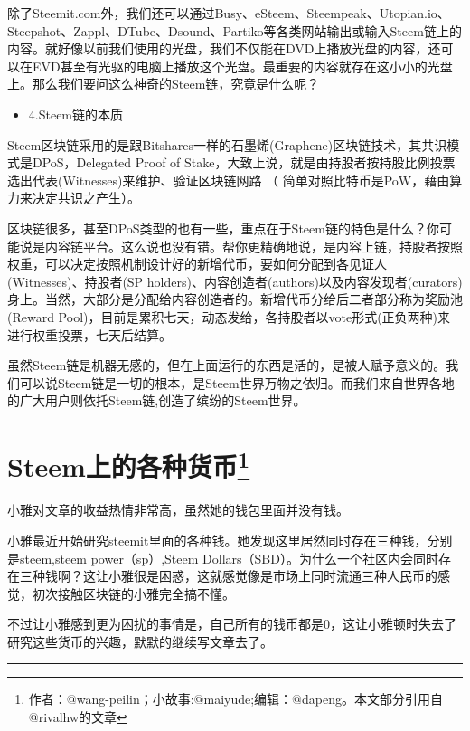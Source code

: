 \documentclass[]{ctexbook}
\providecommand{\tightlist}{%
  \setlength{\itemsep}{0pt}\setlength{\parskip}{0pt}}
\begin{document}
除了Steemit.com外，我们还可以通过Busy、eSteem、Steempeak、Utopian.io、Steepshot、Zappl、DTube、Dsound、Partiko等各类网站输出或输入Steem链上的内容。就好像以前我们使用的光盘，我们不仅能在DVD上播放光盘的内容，还可以在EVD甚至有光驱的电脑上播放这个光盘。最重要的内容就存在这小小的光盘上。那么我们要问这么神奇的Steem链，究竟是什么呢？

\begin{itemize}
\tightlist
\item
  4.Steem链的本质
\end{itemize}

Steem区块链采用的是跟Bitshares一样的石墨烯(Graphene)区块链技术，其共识模式是DPoS，Delegated Proof of Stake，大致上说，就是由持股者按持股比例投票选出代表(Witnesses)来维护、验证区块链网路 （ 简单对照比特币是PoW，藉由算力来决定共识之产生）。

区块链很多，甚至DPoS类型的也有一些，重点在于Steem链的特色是什么？你可能说是内容链平台。这么说也没有错。帮你更精确地说，是内容上链，持股者按照权重，可以决定按照机制设计好的新增代币，要如何分配到各见证人(Witnesses)、持股者(SP holders)、内容创造者(authors)以及内容发现者(curators)身上。当然，大部分是分配给内容创造者的。新增代币分给后二者部分称为奖励池(Reward Pool)，目前是累积七天，动态发给，各持股者以vote形式(正负两种)来进行权重投票，七天后结算。

虽然Steem链是机器无感的，但在上面运行的东西是活的，是被人赋予意义的。我们可以说Steem链是一切的根本，是Steem世界万物之依归。而我们来自世界各地的广大用户则依托Steem链,创造了缤纷的Steem世界。

\hypertarget{gzhb}{%
\section[Steem上的各种货币]{\texorpdfstring{Steem上的各种货币\footnote{作者：@wang-peilin；小故事:@maiyude;编辑：@dapeng。本文部分引用自@rivalhw的文章}}{Steem上的各种货币}}\label{gzhb}}

小雅对文章的收益热情非常高，虽然她的钱包里面并没有钱。

小雅最近开始研究steemit里面的各种钱。她发现这里居然同时存在三种钱，分别是steem,steem power（sp）,Steem Dollars（SBD）。为什么一个社区内会同时存在三种钱啊？这让小雅很是困惑，这就感觉像是市场上同时流通三种人民币的感觉，初次接触区块链的小雅完全搞不懂。

不过让小雅感到更为困扰的事情是，自己所有的钱币都是0，这让小雅顿时失去了研究这些货币的兴趣，默默的继续写文章去了。

\begin{center}\rule{0.5\linewidth}{\linethickness}\end{center}
\end{document}
